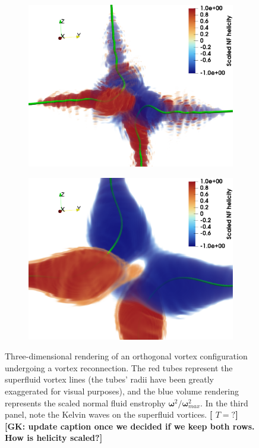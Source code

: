 \documentclass[%
 reprint,
 amsmath,amssymb,
 aps,
 prl,
]{revtex4-2}
\newcommand{\bom}{\boldsymbol{\omega}}
\newcommand*{\NOTE}[1]{\textbf{\color{red}[#1]}}
\begin{document}
\begin{figure}
\begin{subfigure}[b]{0.24\textwidth}
		\includegraphics*[width=\textwidth]{snaps-hel-3.pdf}
	\end{subfigure}
    \begin{subfigure}[b]{0.24\textwidth}
		\centering
		\includegraphics*[width=\textwidth]{snaps-hel-4.pdf}
	\end{subfigure} \hfill
	\caption{Three-dimensional rendering of an orthogonal vortex configuration 
undergoing a vortex reconnection. The red tubes represent
the superfluid vortex
lines (the tubes' radii have been greatly exaggerated for visual purposes), 
and the blue volume rendering represents the scaled normal fluid enstrophy 
$\bom^2/\bom^2_{max}$. In the third panel, note the Kelvin waves on the superfluid vortices. \NOTE{ $T=?$} \NOTE{GK: update caption once we decided if we keep both rows. How is helicity scaled?}}
    \label{fig:visualisation}
\end{figure}
\end{document}
